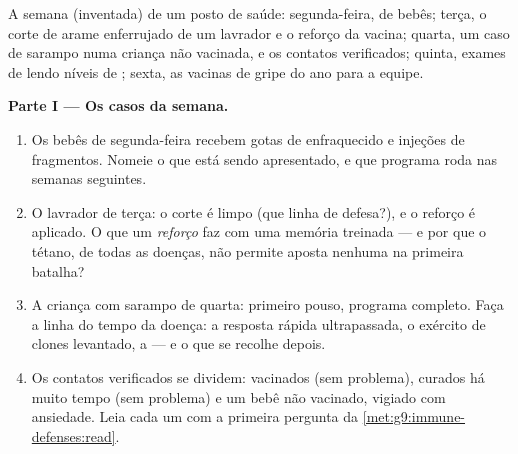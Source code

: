 \begin{problem}\label{pb:g9:immune-defenses:1}
A semana (inventada) de um posto de saúde: segunda-feira,
 de bebês; terça, o corte de arame enferrujado de um
lavrador e o reforço da vacina; quarta, um caso de sarampo
numa criança não vacinada, e os contatos verificados; quinta,
exames de  lendo níveis de ; sexta, as
vacinas de gripe do ano para a equipe.

\medskip\noindent\textbf{Parte I --- Os casos da semana.}
\begin{enumerate}
  \item Os bebês de segunda-feira recebem gotas de 
        enfraquecido e injeções de fragmentos. Nomeie o que
        está sendo apresentado, e que programa roda nas
        semanas seguintes.
  \item O lavrador de terça: o corte é limpo (que linha de
        defesa?), e o reforço é aplicado. O que um
        \emph{reforço} faz com uma memória treinada --- e por
        que o tétano, de todas as doenças, não permite aposta
        nenhuma na primeira batalha?
  \item A criança com sarampo de quarta: primeiro pouso,
        programa completo. Faça a linha do tempo da doença: a
        resposta rápida ultrapassada, o exército de clones
        levantado, a  --- e o que se recolhe
        depois.
  \item Os contatos verificados se dividem: vacinados (sem
        problema), curados há muito tempo (sem problema) e um
        bebê não vacinado, vigiado com ansiedade. Leia cada um
        com a primeira pergunta da
        \cref{met:g9:immune-defenses:read}.
\end{enumerate}


\end{problem}
